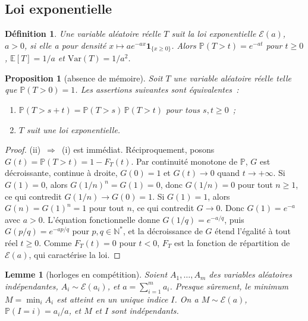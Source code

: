 \documentclass[10pt,a4paper,twocolumn]{article}
\theoremstyle{enonce}
\newtheorem{proposition}[theoreme]{Proposition}
\newtheorem{lemme}[theoreme]{Lemme}
\theoremstyle{defi}
\newtheorem{definition}[theoreme]{Définition}
\newcommand{\PP}{\mathbb{P}}
\newcommand{\EE}{\mathbb{E}}
\newcommand{\un}{\mathbf{1}}
\begin{document}
\subsection{Loi exponentielle}

\begin{definition}
Une variable aléatoire réelle $T$ suit la loi exponentielle $\mathcal{E}(a)$, $a>0$, si elle a pour densité $x\mapsto ae^{-ax}\un_{\{x\geq0\}}$. Alors $\PP(T>t)=e^{-at}$ pour $t\geq0$, $\EE[T]=1/a$ et $\mathrm{Var}(T)=1/a^2$.
\end{definition}

\begin{proposition}[absence de mémoire]\label{prop:memoire}
Soit $T$ une variable aléatoire réelle telle que $\PP(T>0)=1$. Les assertions suivantes sont équivalentes~:
\begin{enumerate}[label=(\roman*)]
\item $\PP(T>s+t)=\PP(T>s)\,\PP(T>t)$ pour tous $s,t\geq0$~;
\item $T$ suit une loi exponentielle.
\end{enumerate}
\end{proposition}

\begin{proof}
(ii)~$\Rightarrow$~(i) est immédiat. Réciproquement, posons $G(t)=\PP(T>t)=1-F_T(t)$. Par continuité monotone de $\PP$, $G$ est décroissante, continue à droite, $G(0)=1$ et $G(t)\to0$ quand $t\to+\infty$. Si $G(1)=0$, alors $G(1/n)^n=G(1)=0$, donc $G(1/n)=0$ pour tout $n\geq1$, ce qui contredit $G(1/n)\to G(0)=1$. Si $G(1)=1$, alors $G(n)=G(1)^n=1$ pour tout $n$, ce qui contredit $G\to0$. Donc $G(1)=e^{-a}$ avec $a>0$. L'équation fonctionnelle donne $G(1/q)=e^{-a/q}$, puis $G(p/q)=e^{-ap/q}$ pour $p,q\in\mathbb{N}^*$, et la décroissance de $G$ étend l'égalité à tout réel $t\geq0$. Comme $F_T(t)=0$ pour $t<0$, $F_T$ est la fonction de répartition de $\mathcal{E}(a)$, qui caractérise la loi.
\end{proof}

\begin{lemme}[horloges en compétition]\label{lem:horloges}
Soient $A_1,\dots,A_m$ des variables aléatoires indépendantes, $A_i\sim\mathcal{E}(a_i)$, et $a=\sum_{i=1}^ma_i$. Presque sûrement, le minimum $M=\min_iA_i$ est atteint en un unique indice $I$. On a $M\sim\mathcal{E}(a)$, $\PP(I=i)=a_i/a$, et $M$ et $I$ sont indépendants.
\end{lemme}
\end{document}
